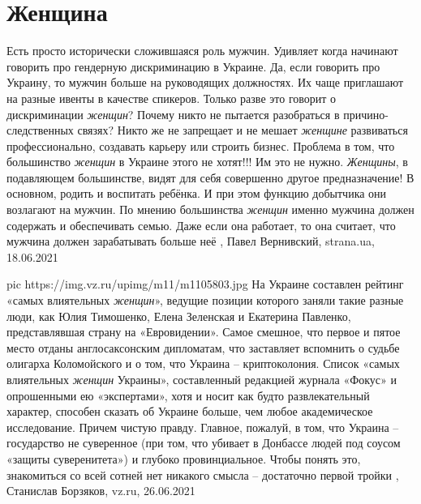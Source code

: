  
 
 
 
 
\chapter{Женщина}
\label{sec:slova.zhenschina}

Есть просто исторически сложившаяся роль мужчин.  Удивляет когда начинают
говорить про гендерную дискриминацию в Украине.  Да, если говорить про Украину,
то мужчин больше на руководящих должностях. Их чаще приглашают на разные ивенты
в качестве спикеров.  Только разве это говорит о дискриминации \emph{женщин}?
Почему никто не пытается разобраться в причино-следственных связях?  Никто же
не запрещает и не мешает \emph{женщине} развиваться профессионально, создавать
карьеру или строить бизнес.  Проблема в том, что большинство \emph{женщин} в
Украине этого не хотят!!! Им это не нужно. \emph{Женщины}, в подавляющем
большинстве, видят для себя совершенно другое предназначение! В основном,
родить и воспитать ребёнка.  И при этом функцию добытчика они возлагают на
мужчин. По мнению большинства \emph{женщин} именно мужчина должен содержать и
обеспечивать семью. Даже если она работает, то она считает, что мужчина должен
зарабатывать больше неё
, 
Павел Вернивский, strana.ua, 18.06.2021

\ifcmt
  pic https://img.vz.ru/upimg/m11/m1105803.jpg
\fi
На Украине составлен рейтинг «самых влиятельных \emph{женщин}», ведущие позиции
которого заняли такие разные люди, как Юлия Тимошенко, Елена Зеленская и
Екатерина Павленко, представлявшая страну на «Евровидении». Самое смешное, что
первое и пятое место отданы англосаксонским дипломатам, что заставляет
вспомнить о судьбе олигарха Коломойского и о том, что Украина – криптоколония.
Список «самых влиятельных \emph{женщин} Украины», составленный редакцией журнала
«Фокус» и опрошенными ею «экспертами», хотя и носит как будто развлекательный
характер, способен сказать об Украине больше, чем любое академическое
исследование. Причем чистую правду.  Главное, пожалуй, в том, что Украина –
государство не суверенное (при том, что убивает в Донбассе людей под соусом
«защиты суверенитета») и глубоко провинциальное. Чтобы понять это, знакомиться
со всей сотней нет никакого смысла – достаточно первой тройки
, 
Станислав Борзяков, vz.ru, 26.06.2021

